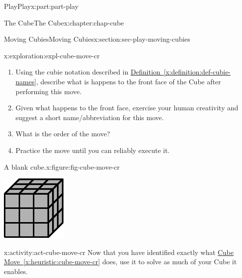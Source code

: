 \documentclass[oneside,10pt,]{book}
\newcommand{\xreffont}{\relax}
\numberwithin{equation}{section}
\begin{document}
\begin{partptx}{Play}{}{Play}{}{}{x:part:part-play}
\begin{chapterptx}{The Cube}{}{The Cube}{}{}{x:chapter:chap-cube}
\begin{sectionptx}{Moving Cubies}{}{Moving Cubies}{}{}{x:section:sec-play-moving-cubies}
\begin{exploration}{}{x:exploration:expl-cube-move-cr}
\begin{enumerate}
\item{}Using the cubie notation described in \hyperref[x:definition:def-cubie-names]{Definition~{\xreffont\ref{x:definition:def-cubie-names}}}, describe what is happens to the front face of the Cube after performing this move.%
\item{}Given what happens to the front face, exercise your human creativity and suggest a short name\slash{}abbreviation for this move.%
\item{}What is the order of the move?%
\item{}Practice the move until you can reliably execute it.%
\end{enumerate}
\begin{figureptx}{A blank cube.}{x:figure:fig-cube-move-cr}{}%
\begin{image}{0.25}{0.5}{0.25}%
\includegraphics[width=\linewidth]{./images/grey_cube.pdf}
\end{image}%
\tcblower
\end{figureptx}%
\end{exploration}%
\begin{activity}{}{x:activity:act-cube-move-cr}%
Now that you have identified exactly what \hyperref[x:heuristic:cube-move-cr]{Cube Move~{\xreffont\ref{x:heuristic:cube-move-cr}}} does, use it to solve as much of your Cube it enables.%
\end{activity}%

\end{sectionptx}
\end{chapterptx}
\end{partptx}
\end{document}
